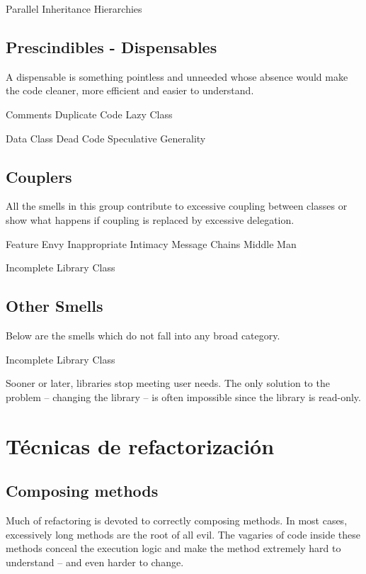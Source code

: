 \documentclass[11pt,a4paper,oneside]{book}
\begin{document}
    Parallel Inheritance Hierarchies




\section{Prescindibles - Dispensables}

A dispensable is something pointless and unneeded whose absence would make the code cleaner, more efficient and easier to understand.

    Comments
    Duplicate Code
    Lazy Class

    Data Class
    Dead Code
    Speculative Generality



\section{Couplers}

All the smells in this group contribute to excessive coupling between classes or show what happens if coupling is replaced by excessive delegation.

    Feature Envy
    Inappropriate Intimacy
    Message Chains
    Middle Man

    Incomplete Library Class


\section{Other Smells}

Below are the smells which do not fall into any broad category.

Incomplete Library Class

Sooner or later, libraries stop meeting user needs. The only solution to the problem – changing the library – is often impossible since the library is read-only.



\chapter{Técnicas de refactorización}


\section{Composing methods}

Much of refactoring is devoted to correctly composing methods. In most cases, excessively long methods are the root of all evil. The vagaries of code inside these methods conceal the execution logic and make the method extremely hard to understand – and even harder to change.
\end{document}

